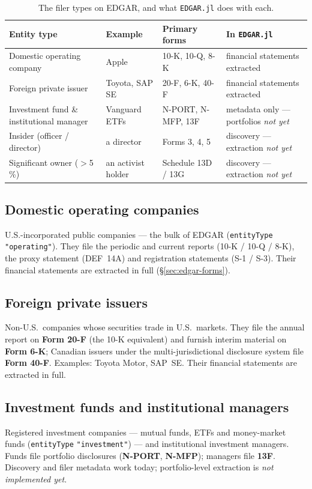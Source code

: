 \documentclass[11pt,a4paper]{report}
\begin{document}
\begin{table}[h]
\centering
\small
\caption{The filer types on EDGAR, and what \texttt{EDGAR.jl} does with each.}
\label{tab:edgar-entities}
\begin{tabular}{@{}p{}p{}p{}p{}@{}}
\toprule
\textbf{Entity type} & \textbf{Example} & \textbf{Primary forms} & \textbf{In \texttt{EDGAR.jl}} \\
\midrule
Domestic operating company & Apple & 10-K, 10-Q, 8-K & financial statements extracted \\
Foreign private issuer & Toyota, SAP SE & 20-F, 6-K, 40-F & financial statements extracted \\
Investment fund \& institutional manager & Vanguard ETFs & N-PORT, N-MFP, 13F & metadata only --- portfolios \emph{not yet} \\
Insider (officer / director) & a director & Forms 3, 4, 5 & discovery --- extraction \emph{not yet} \\
Significant owner ($>$5\,\%) & an activist holder & Schedule 13D / 13G & discovery --- extraction \emph{not yet} \\
\bottomrule
\end{tabular}
\end{table}

\subsection{Domestic operating companies}
U.S.-incorporated public companies --- the bulk of EDGAR (\texttt{entityType} \texttt{"operating"}). They
file the periodic and current reports (10-K / 10-Q / 8-K), the proxy statement (DEF~14A) and registration
statements (S-1 / S-3). Their financial statements are extracted in full (\S\ref{sec:edgar-forms}).

\subsection{Foreign private issuers}
Non-U.S.\ companies whose securities trade in U.S.\ markets. They file the annual report on \textbf{Form
20-F} (the 10-K equivalent) and furnish interim material on \textbf{Form 6-K}; Canadian issuers under the
multi-jurisdictional disclosure system file \textbf{Form 40-F}. Examples: Toyota Motor, SAP~SE. Their
financial statements are extracted in full.

\subsection{Investment funds and institutional managers}
Registered investment companies --- mutual funds, ETFs and money-market funds (\texttt{entityType}
\texttt{"investment"}) --- and institutional investment managers. Funds file portfolio disclosures
(\textbf{N-PORT}, \textbf{N-MFP}); managers file \textbf{13F}. Discovery and filer metadata work today;
portfolio-level extraction is \emph{not implemented yet}.
\end{document}
